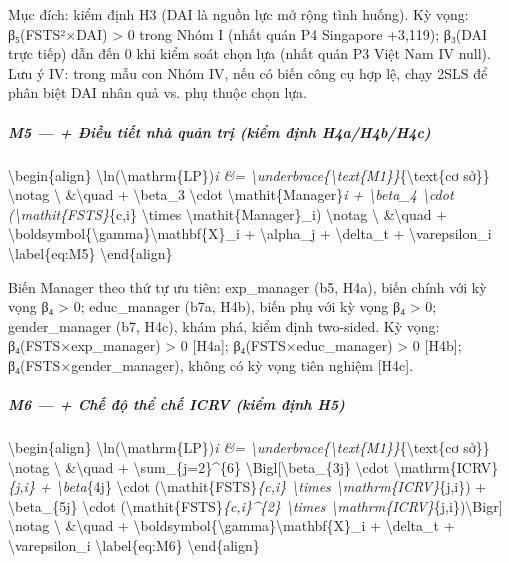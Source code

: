 \documentclass[12pt,a4paper]{article}
\begin{document}
Mục đích: kiểm định H3 (DAI là nguồn lực mở rộng tình huống). Kỳ vọng:
β₅(FSTS²×DAI) \textgreater{} 0 trong Nhóm I (nhất quán P4 Singapore
+3,119); β₃(DAI trực tiếp) dẫn đến 0 khi kiểm soát chọn lựa (nhất quán
P3 Việt Nam IV null). Lưu ý IV: trong mẫu con Nhóm IV, nếu có biến công
cụ hợp lệ, chạy 2SLS để phân biệt DAI nhân quả vs. phụ thuộc chọn lựa.

\hypertarget{m5---ux111iux1ec1u-tiux1ebft-nhuxe0-quux1ea3n-trux1ecb-kiux1ec3m-ux111ux1ecbnh-h4ah4bh4c}{%
\subparagraph{M5 --- + Điều tiết nhà quản trị (kiểm định
H4a/H4b/H4c)}\label{m5---ux111iux1ec1u-tiux1ebft-nhuxe0-quux1ea3n-trux1ecb-kiux1ec3m-ux111ux1ecbnh-h4ah4bh4c}}

\textbackslash begin\{align\}
\textbackslash ln(\textbackslash mathrm\{LP\})\emph{i \&=
\textbackslash underbrace\{\textbackslash text\{M1\}\}}\{\textbackslash text\{cơ
sở\}\} \textbackslash notag \textbackslash{} \&\textbackslash quad +
\textbackslash beta\_3 \textbackslash cdot
\textbackslash mathit\{Manager\}\emph{i + \textbackslash beta\_4
\textbackslash cdot (\textbackslash mathit\{FSTS\}}\{c,i\}
\textbackslash times \textbackslash mathit\{Manager\}\_i)
\textbackslash notag \textbackslash{} \&\textbackslash quad +
\textbackslash boldsymbol\{\textbackslash gamma\}\textquotesingle\textbackslash mathbf\{X\}\_i
+ \textbackslash alpha\_j + \textbackslash delta\_t +
\textbackslash varepsilon\_i \textbackslash label\{eq:M5\}
\textbackslash end\{align\}

Biến Manager theo thứ tự ưu tiên: exp\_manager (b5, H4a), biến chính với
kỳ vọng β₄ \textgreater{} 0; educ\_manager (b7a, H4b), biến phụ với kỳ
vọng β₄ \textgreater{} 0; gender\_manager (b7, H4c), khám phá, kiểm định
two-sided. Kỳ vọng: β₄(FSTS×exp\_manager) \textgreater{} 0 {[}H4a{]};
β₄(FSTS×educ\_manager) \textgreater{} 0 {[}H4b{]};
β₄(FSTS×gender\_manager), không có kỳ vọng tiên nghiệm {[}H4c{]}.

\hypertarget{m6---chux1ebf-ux111ux1ed9-thux1ec3-chux1ebf-icrv-kiux1ec3m-ux111ux1ecbnh-h5}{%
\subparagraph{M6 --- + Chế độ thể chế ICRV (kiểm định
H5)}\label{m6---chux1ebf-ux111ux1ed9-thux1ec3-chux1ebf-icrv-kiux1ec3m-ux111ux1ecbnh-h5}}

\textbackslash begin\{align\}
\textbackslash ln(\textbackslash mathrm\{LP\})\emph{i \&=
\textbackslash underbrace\{\textbackslash text\{M1\}\}}\{\textbackslash text\{cơ
sở\}\} \textbackslash notag \textbackslash{} \&\textbackslash quad +
\textbackslash sum\_\{j=2\}\^{}\{6\}
\textbackslash Bigl{[}\textbackslash beta\_\{3j\} \textbackslash cdot
\textbackslash mathrm\{ICRV\}\emph{\{j,i\} + \textbackslash beta}\{4j\}
\textbackslash cdot (\textbackslash mathit\{FSTS\}\emph{\{c,i\}
\textbackslash times \textbackslash mathrm\{ICRV\}}\{j,i\}) +
\textbackslash beta\_\{5j\} \textbackslash cdot
(\textbackslash mathit\{FSTS\}\emph{\{c,i\}\^{}\{2\}
\textbackslash times
\textbackslash mathrm\{ICRV\}}\{j,i\})\textbackslash Bigr{]}
\textbackslash notag \textbackslash{} \&\textbackslash quad +
\textbackslash boldsymbol\{\textbackslash gamma\}\textquotesingle\textbackslash mathbf\{X\}\_i
+ \textbackslash delta\_t + \textbackslash varepsilon\_i
\textbackslash label\{eq:M6\} \textbackslash end\{align\}
\end{document}
